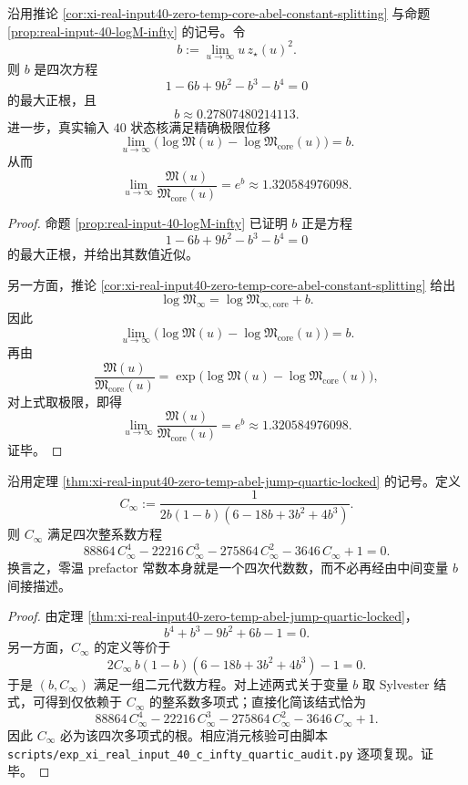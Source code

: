\begin{theorem}\label{thm:xi-real-input40-zero-temp-abel-jump-quartic-locked}
沿用推论 \ref{cor:xi-real-input40-zero-temp-core-abel-constant-splitting} 与命题 \ref{prop:real-input-40-logM-infty} 的记号。令
\[
b:=\lim_{u\to\infty}u\,z_\star(u)^2.
\]
则 \(b\) 是四次方程
\[
1-6b+9b^2-b^3-b^4=0
\]
的最大正根，且
\[
b\approx 0.27807480214113.
\]
进一步，真实输入 \(40\) 状态核满足精确极限位移
\[
\boxed{\;
\lim_{u\to\infty}
\bigl(\log\mathfrak M(u)-\log\mathfrak M_{\mathrm{core}}(u)\bigr)
=
b.\;}
\]
从而
\[
\boxed{\;
\lim_{u\to\infty}
\frac{\mathfrak M(u)}{\mathfrak M_{\mathrm{core}}(u)}
=
e^{b}
\approx 1.320584976098.\;}
\]
\end{theorem}
\begin{proof}
命题 \ref{prop:real-input-40-logM-infty} 已证明 \(b\) 正是方程
\[
1-6b+9b^2-b^3-b^4=0
\]
的最大正根，并给出其数值近似。

另一方面，推论 \ref{cor:xi-real-input40-zero-temp-core-abel-constant-splitting} 给出
\[
\log\mathfrak M_\infty
=
\log\mathfrak M_{\infty,\mathrm{core}}+b.
\]
因此
\[
\lim_{u\to\infty}
\bigl(\log\mathfrak M(u)-\log\mathfrak M_{\mathrm{core}}(u)\bigr)
=
b.
\]
再由
\[
\frac{\mathfrak M(u)}{\mathfrak M_{\mathrm{core}}(u)}
=
\exp\!\bigl(\log\mathfrak M(u)-\log\mathfrak M_{\mathrm{core}}(u)\bigr),
\]
对上式取极限，即得
\[
\lim_{u\to\infty}
\frac{\mathfrak M(u)}{\mathfrak M_{\mathrm{core}}(u)}
=
e^b
\approx 1.320584976098.
\]
证毕。
\end{proof}

\begin{proposition}\label{prop:xi-real-input40-cinf-quartic-elimination}
沿用定理 \ref{thm:xi-real-input40-zero-temp-abel-jump-quartic-locked} 的记号。定义
\[
C_\infty:=
\frac{1}{2b(1-b)(6-18b+3b^2+4b^3)}.
\]
则 \(C_\infty\) 满足四次整系数方程
\[
\boxed{\;
88864\,C_\infty^4
-22216\,C_\infty^3
-275864\,C_\infty^2
-3646\,C_\infty
+1=0.\;}
\]
换言之，零温 prefactor 常数本身就是一个四次代数数，而不必再经由中间变量 \(b\) 间接描述。
\end{proposition}
\begin{proof}
由定理 \ref{thm:xi-real-input40-zero-temp-abel-jump-quartic-locked}，
\[
b^4+b^3-9b^2+6b-1=0.
\]
另一方面，\(C_\infty\) 的定义等价于
\[
2C_\infty\,b(1-b)(6-18b+3b^2+4b^3)-1=0.
\]
于是 \((b,C_\infty)\) 满足一组二元代数方程。对上述两式关于变量 \(b\) 取 Sylvester 结式，可得到仅依赖于 \(C_\infty\) 的整系数多项式；直接化简该结式恰为
\[
88864\,C_\infty^4
-22216\,C_\infty^3
-275864\,C_\infty^2
-3646\,C_\infty
+1.
\]
因此 \(C_\infty\) 必为该四次多项式的根。相应消元核验可由脚本
\texttt{scripts/exp\_xi\_real\_input\_40\_c\_infty\_quartic\_audit.py}
逐项复现。证毕。
\end{proof}

